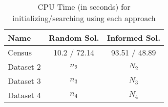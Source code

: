 	\begin{table}[ h ]
		\centering
		\begin{tabular}{ | l | c | c | }
			\hline
			Name & Random Sol. & Informed Sol. \\ \hline
			Census & 10.2 / 72.14 & 93.51 / 48.89 \\ \hline
			Dataset 2 & $n_2$ & $N_2$ \\ \hline
			Dataset 3 & $n_3$ & $N_3$ \\ \hline
			Dataset 4 & $n_4$ & $N_4$ \\ \hline
		\end{tabular}
		\caption{CPU Time (in seconds) for initializing/searching using each approach}
		\label{tab:times}
	\end{table}